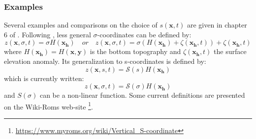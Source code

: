 \subsubsection{Examples}
Several examples and comparisons on the choice of $s(\mathbf{x},t)$ are given in chapter 6 of \citet{griffies_fundamentals_2004}.
Following  \citet{shchepetkin_regional_2005},  less general $\sigma$-coordinates can be defined by:
\begin{equation}
 \displaystyle
 z(\mathbf{x},\sigma,t)=\sigma H(\mathbf{x_h})\quad or\quad z(\mathbf{x},\sigma,t)=\sigma(H(\mathbf{x_h})+\zeta(\mathbf{x_h},t))+\zeta(\mathbf{x_h},t)
\end{equation}
where $H(\mathbf{x_h})=H(\mathbf{x,y})$ is the bottom topography and $\zeta(\mathbf{x_h},t)$ the surface elevation anomaly. Its generalization to s-coordinates is defined by:
\begin{equation}
 \displaystyle
 z(\mathbf{x},s,t)=\mathcal{S}(s) H(\mathbf{x_h})
\end{equation}
which is currently written:
\begin{equation}
 \displaystyle
 z(\mathbf{x},\sigma,t)=\mathcal{S}(\sigma) H(\mathbf{x_h})
\end{equation}
and $S(\sigma)$ can be a non-linear function. Some current definitions are presented on the Wiki-Roms web-site \footnote{\url{https://www.myroms.org/wiki/Vertical_S-coordinate}}.


